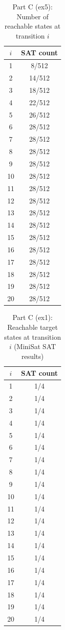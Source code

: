\documentclass[10pt]{article}
\begin{document}
\begin{table}[H]
\centering
\caption{Part C (ex5): Number of reachable states at transition $i$}
\label{tab:ex5_partc_reach}
\begin{tabular}{c c}
\toprule
$i$ & SAT count \\
\midrule
1  & 8/512  \\
2  & 14/512 \\
3  & 18/512 \\
4  & 22/512 \\
5  & 26/512 \\
6  & 28/512 \\
7  & 28/512 \\
8  & 28/512 \\
9  & 28/512 \\
10 & 28/512 \\
11 & 28/512 \\
12 & 28/512 \\
13 & 28/512 \\
14 & 28/512 \\
15 & 28/512 \\
16 & 28/512 \\
17 & 28/512 \\
18 & 28/512 \\
19 & 28/512 \\
20 & 28/512 \\
\bottomrule
\end{tabular}
\end{table}

\begin{table}[H]
\centering
\caption{Part C (ex1): Reachable target states at transition $i$ (MiniSat SAT results)}
\label{tab:ex1_partc_reach}
\begin{tabular}{c c}
\toprule
$i$ & SAT count \\
\midrule
1  & 1/4 \\
2  & 1/4 \\
3  & 1/4\\
4  & 1/4 \\
5  & 1/4 \\
6  & 1/4 \\
7  & 1/4 \\
8  & 1/4 \\
9  & 1/4 \\
10 & 1/4 \\
11 & 1/4 \\
12 & 1/4 \\
13 & 1/4 \\
14 & 1/4 \\
15 & 1/4 \\
16 & 1/4 \\
17 & 1/4 \\
18 & 1/4 \\
19 & 1/4 \\
20 & 1/4 \\
\bottomrule
\end{tabular}
\end{table}
\end{document}
